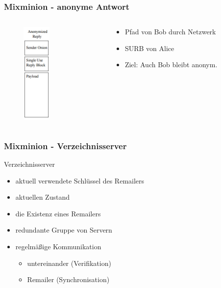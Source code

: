 \documentclass{beamer}
\begin{document}
\begin{frame}
	\frametitle{Mixminion - anonyme Antwort}

	\begin{columns}[T]
		\begin{column}{3cm}
			\begin{figure}
				\centering
				\includegraphics[height=5cm]{bilder/mixminion_anonreply.jpg}
			\end{figure}
		\end{column}
		\begin{column}{7cm}
				\vspace{2cm}
				\begin{itemize}	
					\item Pfad von Bob durch Netzwerk
					\item SURB von Alice
					\item Ziel: Auch Bob bleibt anonym.
				\end{itemize}
		\end{column}
	\end{columns}
\end{frame}

\begin{frame}
	\frametitle{Mixminion - Verzeichnisserver}

	\begin{block}{Verzeichnisserver}
		\begin{itemize}
			\item aktuell verwendete Schlüssel des Remailers
			\item aktuellen Zustand
			\item die Existenz eines Remailers
		\end{itemize}
	\end{block}

	\begin{itemize}
		\item redundante Gruppe von Servern
		\item regelmäßige Kommunikation
		\begin{itemize}
			\item untereinander (Verifikation)
			\item Remailer (Synchronisation)
		\end{itemize}
	\end{itemize}
\end{frame}
\end{document}
